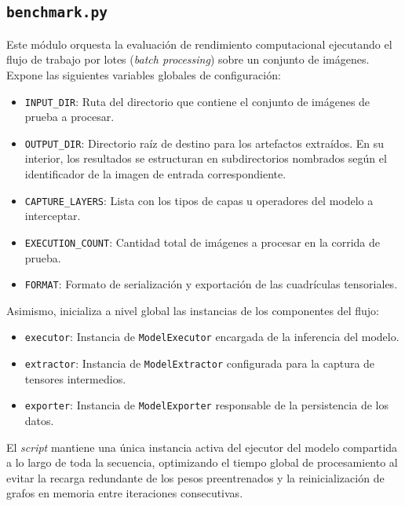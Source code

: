 \subsection{\texttt{benchmark.py}}
Este módulo orquesta la evaluación de rendimiento computacional ejecutando el flujo de trabajo por lotes (\textit{batch processing}) 
sobre un conjunto de imágenes. Expone las siguientes variables globales de configuración:

\begin{itemize}
    \item \texttt{INPUT\_DIR}: Ruta del directorio que contiene el conjunto de imágenes de prueba a procesar.
    \item \texttt{OUTPUT\_DIR}: Directorio raíz de destino para los artefactos extraídos. En su interior, los resultados se 
    estructuran en subdirectorios nombrados según el identificador de la imagen de entrada correspondiente.
    \item \texttt{CAPTURE\_LAYERS}: Lista con los tipos de capas u operadores del modelo a interceptar.
    \item \texttt{EXECUTION\_COUNT}: Cantidad total de imágenes a procesar en la corrida de prueba.
    \item \texttt{FORMAT}: Formato de serialización y exportación de las cuadrículas tensoriales.
\end{itemize}

Asimismo, inicializa a nivel global las instancias de los componentes del flujo:
\begin{itemize}
    \item \texttt{executor}: Instancia de \texttt{ModelExecutor} encargada de la inferencia del modelo.
    \item \texttt{extractor}: Instancia de \texttt{ModelExtractor} configurada para la captura de tensores intermedios.
    \item \texttt{exporter}: Instancia de \texttt{ModelExporter} responsable de la persistencia de los datos.
\end{itemize}
El \textit{script} mantiene una única instancia activa del ejecutor del modelo compartida a lo largo de toda la secuencia, optimizando el tiempo 
global de procesamiento al evitar la recarga redundante de los pesos preentrenados y la reinicialización de grafos en memoria entre iteraciones consecutivas.
\medskip

